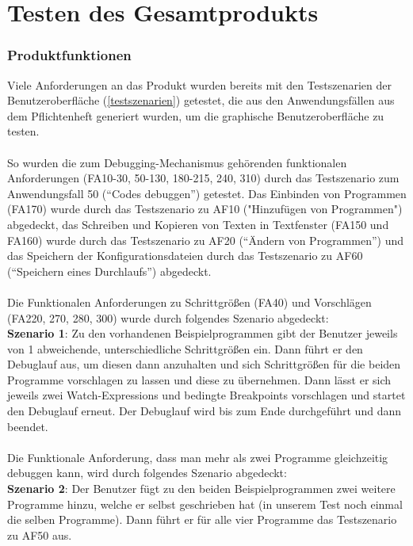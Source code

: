 \documentclass[parskip=full]{scrartcl}
\begin{document}
\newpage
\section{Testen des Gesamtprodukts}\label{gesamthwsw}

\subsubsection{Produktfunktionen}
Viele Anforderungen an das Produkt wurden bereits mit den Testszenarien der Benutzeroberfläche (\ref{testszenarien}) getestet, die aus den Anwendungsfällen aus dem Pflichtenheft generiert wurden, um die graphische Benutzeroberfläche zu testen.
\\
 \\
So wurden die zum Debugging-Mechanismus gehörenden funktionalen Anforderungen (FA10-30, 50-130, 180-215, 240, 310) durch das Testszenario zum Anwendungsfall 50 (\enquote{Codes debuggen}) getestet.
Das Einbinden von Programmen (FA170) wurde durch das Testszenario zu AF10 ("Hinzufügen von Programmen") abgedeckt, das Schreiben und Kopieren von Texten in Textfenster (FA150 und FA160) wurde durch das Testszenario zu AF20 (\enquote{Ändern von Programmen}) und das Speichern der Konfigurationsdateien durch das Testszenario zu AF60 (\enquote{Speichern eines Durchlaufs}) abgedeckt.
\\
 \\
Die Funktionalen Anforderungen zu Schrittgrößen (FA40) und Vorschlägen (FA220, 270, 280, 300) wurde durch folgendes Szenario abgedeckt: \\
\textbf{Szenario 1}: Zu den vorhandenen Beispielprogrammen gibt der Benutzer jeweils von 1 abweichende, unterschiedliche Schrittgrößen ein. Dann führt er den Debuglauf aus, um diesen dann anzuhalten und sich Schrittgrößen für die beiden Programme vorschlagen zu lassen und diese zu übernehmen. Dann lässt er sich jeweils zwei Watch-Expressions und bedingte Breakpoints vorschlagen und startet den Debuglauf erneut. Der Debuglauf wird bis zum Ende durchgeführt und dann beendet.
\\
 \\
Die Funktionale Anforderung, dass man mehr als zwei Programme gleichzeitig debuggen kann, wird durch folgendes Szenario abgedeckt: 
\\
\textbf{Szenario 2}: Der Benutzer fügt zu den beiden Beispielprogrammen zwei weitere Programme hinzu, welche er selbst geschrieben hat (in unserem Test noch einmal die selben Programme). Dann führt er für alle vier Programme das Testszenario zu AF50 aus.
\end{document}
